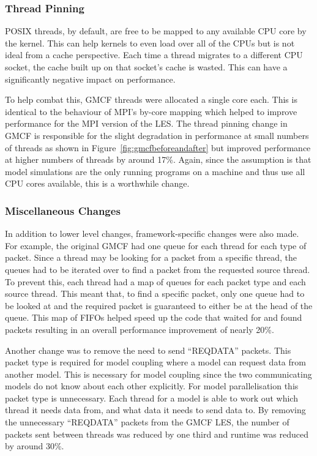 \subsubsection{Thread Pinning}

POSIX threads, by default, are free to be mapped to any available CPU core by
the kernel. This can help kernels to even load over all of the CPUs but is not
ideal from a cache perspective. Each time a thread migrates to a different CPU
socket, the cache built up on that socket's cache is wasted. This can have a
significantly negative impact on performance.

To help combat this, GMCF threads were allocated a single core each. This is
identical to the behaviour of MPI's by-core mapping which helped to improve
performance for the MPI version of the LES. The thread pinning change in GMCF is
responsible for the slight degradation in performance at small numbers of
threads as shown in Figure~\ref{fig:gmcfbeforeandafter} but improved performance
at higher numbers of threads by around 17\%. Again, since the assumption is that
model simulations are the only running programs on a machine and thus use all
CPU cores available, this is a worthwhile change.

\subsubsection{Miscellaneous Changes}

In addition to lower level changes, framework-specific changes were also made.
For example, the original GMCF had one queue for each thread for each type of
packet. Since a thread may be looking for a packet from a specific thread, the
queues had to be iterated over to find a packet from the requested source
thread. To prevent this, each thread had a map of queues for each packet type
and each source thread. This meant that, to find a specific packet, only one
queue had to be looked at and the required packet is guaranteed to either be at
the head of the queue. This map of FIFOs helped speed up the code that waited
for and found packets resulting in an overall performance improvement of nearly
20\%.

Another change was to remove the need to send ``REQDATA'' packets. This packet
type is required for model coupling where a model can request data from another
model. This is necessary for model coupling since the two communicating models
do not know about each other explicitly. For model parallelisation this packet
type is unnecessary. Each thread for a model is able to work out which thread it
needs data from, and what data it needs to send data to. By removing the
unnecessary ``REQDATA'' packets from the GMCF LES, the number of packets sent
between threads was reduced by one third and runtime was reduced by around 30\%.

